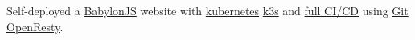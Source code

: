 {Self-deployed a \href{https://www.babylonjs.com/}{BabylonJS} website with \href{https://github.com/sachiniyer/cheap_portable_k3s\#applications}{kubernetes} \href{https://github.com/sachiniyer/cheap_portable_k3s/blob/main/README.pdf}{k3s} and \href{https://blog.sachiniyer.com/posts/post1/}{full CI/CD} using \href{https://github.com/kubernetes/git-sync}{Git OpenResty}.}
